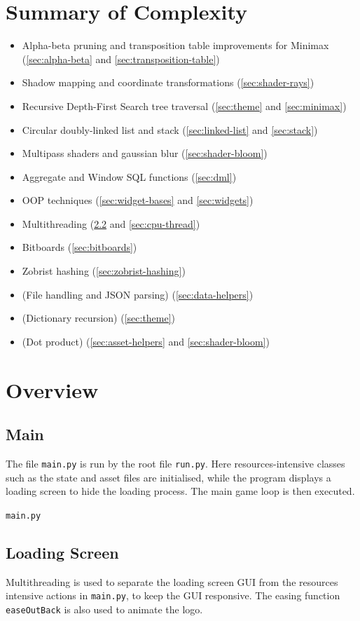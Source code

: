 \documentclass[../main/main.tex]{subfiles}
\begin{document}
\section{Summary of Complexity}
\begin{itemize}
\item Alpha-beta pruning and transposition table improvements for Minimax (\ref{sec:alpha-beta} and \ref{sec:transposition-table})
\item Shadow mapping and coordinate transformations (\ref{sec:shader-rays})
\item Recursive Depth-First Search tree traversal (\ref{sec:theme} and \ref{sec:minimax})
\item Circular doubly-linked list and stack (\ref{sec:linked-list} and \ref{sec:stack})
\item Multipass shaders and gaussian blur (\ref{sec:shader-bloom})
\item Aggregate and Window SQL functions (\ref{sec:dml})
\item OOP techniques (\ref{sec:widget-bases} and \ref{sec:widgets})
\item Multithreading (\ref{sec:loading-screen} and \ref{sec:cpu-thread})
\item Bitboards (\ref{sec:bitboards})
\item Zobrist hashing (\ref{sec:zobrist-hashing})
\item (File handling and JSON parsing) (\ref{sec:data-helpers})
\item (Dictionary recursion) (\ref{sec:theme})
\item (Dot product) (\ref{sec:asset-helpers} and \ref{sec:shader-bloom})
\end{itemize}

\section{Overview}
\subsection{Main}
The file \lstinline{main.py} is run by the root file \lstinline{run.py}. Here resources-intensive classes such as the state and asset files are initialised, while the program displays a loading screen to hide the loading process. The main game loop is then executed.

\noindent\verb|main.py|


\subsection{Loading Screen}
\label{sec:loading-screen}
Multithreading is used to separate the loading screen GUI from the resources intensive actions in \lstinline{main.py}, to keep the GUI responsive. The easing function \lstinline{easeOutBack} is also used to animate the logo.
\end{document}
